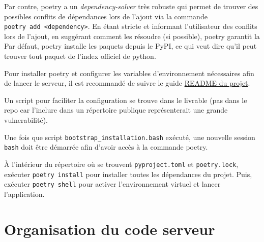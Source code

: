 \documentclass[
  openany]{book}
\begin{document}
Par contre, poetry a un \emph{dependency-solver} très robuste qui permet de trouver
des possibles conflits de dépendances lors de l'ajout via la commande \texttt{poetry\ add\ \textless{}dependency\textgreater{}}.
En étant stricte et informant l'utilisateur des conflits lors de l'ajout, en suggérant
comment les résoudre (si possible), poetry garantit la
Par défaut, poetry installe les paquets depuis le PyPI, ce qui veut dire qu'il peut
trouver tout paquet de l'index officiel de python.

Pour installer poetry et configurer les variables d'environnement nécessaires
afin de lancer le serveur, il est recommandé de suivre le guide
\href{https://github.com/MR-biosoft/AnnotationWebsite}{README du projet}.

Un script pour faciliter la configuration se trouve dans le livrable (pas dans
le repo car l'inclure dans un répertoire publique représenterait une grande
vulnerabilité).

Une fois que script \texttt{bootstrap\_installation.bash} exécuté, une nouvelle
session \texttt{bash} doit être démarrée afin d'avoir accès à la commande poetry.

À l'intérieur du répertoire où se trouvent \texttt{pyproject.toml} et \texttt{poetry.lock},
exécuter \texttt{poetry\ install} pour installer toutes les dépendances du projet.
Puis, exécuter \texttt{poetry\ shell} pour activer l'environnement virtuel et lancer
l'application.

\hypertarget{organisation}{%
\section*{Organisation du code serveur}\label{organisation}}
\end{document}
